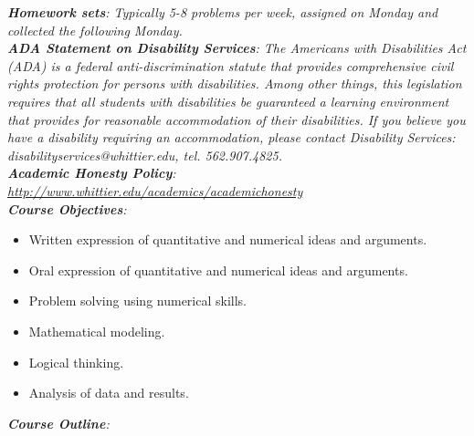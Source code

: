 \documentclass[10pt]{article}
\begin{document}
\textit{\textbf{Homework sets}: Typically 5-8 problems per week, assigned on Monday and collected the following Monday.} \\
\textit{\textbf{ADA Statement on Disability Services}: The Americans with Disabilities Act (ADA) is a federal anti-discrimination statute that provides comprehensive civil rights protection for persons with disabilities. Among other things, this legislation requires that all students with disabilities be guaranteed a learning environment that provides for reasonable accommodation of their disabilities. If you believe you have a disability requiring an accommodation, please contact Disability Services: disabilityservices@whittier.edu, tel. 562.907.4825.} \\
\textit{\textbf{Academic Honesty Policy}: \url{http://www.whittier.edu/academics/academichonesty}} \\
\textit{\textbf{Course Objectives}:}
\begin{itemize}
\item Written expression of quantitative and numerical ideas and arguments.
\item Oral expression of quantitative and numerical ideas and arguments.
\item Problem solving using numerical skills.
\item Mathematical modeling.
\item Logical thinking.
\item Analysis of data and results.
\end{itemize}
\clearpage
\textit{\textbf{Course Outline}:}
\end{document}
